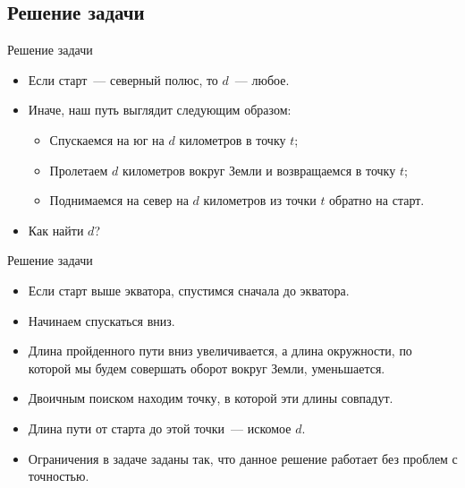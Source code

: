 \subsection{Решение задачи}

\begin{frame}[t]{Решение задачи}
\begin{itemize}
    \item Если старт~--- северный полюс, то $d$~--- любое.
    \item Иначе, наш путь выглядит следующим образом:
    \begin{itemize}
        \item Спускаемся на юг на $d$ километров в точку $t$;
        \item Пролетаем $d$ километров вокруг Земли и возвращаемся в точку $t$;
        \item Поднимаемся на север на $d$ километров из точки $t$ обратно на старт.
    \end{itemize}
    \item Как найти $d$?
\end{itemize}
\end{frame}

\begin{frame}[t]{Решение задачи}
\begin{itemize}
    \item Если старт выше экватора, спустимся сначала до экватора.
    \item Начинаем спускаться вниз.
    \item Длина пройденного пути вниз увеличивается, а длина окружности,
по которой мы будем совершать оборот вокруг Земли, уменьшается.
    \item Двоичным поиском находим точку, в которой эти длины совпадут.
    \item Длина пути от старта до этой точки~--- искомое $d$.
    \item Ограничения в задаче заданы так, что данное решение работает без проблем с точностью.
\end{itemize}
\end{frame}
